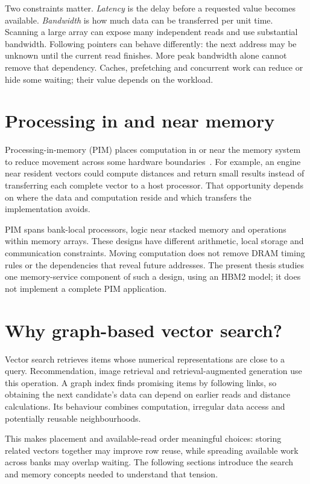 \documentclass[11pt,a4paper]{report}
\begin{document}
Two constraints matter. \emph{Latency} is the delay before a requested value becomes available. \emph{Bandwidth} is how much data can be transferred per unit time. Scanning a large array can expose many independent reads and use substantial bandwidth. Following pointers can behave differently: the next address may be unknown until the current read finishes. More peak bandwidth alone cannot remove that dependency. Caches, prefetching and concurrent work can reduce or hide some waiting; their value depends on the workload.

\section{Processing in and near memory}
Processing-in-memory (PIM) places computation in or near the memory system to reduce movement across some hardware boundaries~\cite{primer}. For example, an engine near resident vectors could compute distances and return small results instead of transferring each complete vector to a host processor. That opportunity depends on where the data and computation reside and which transfers the implementation avoids.

PIM spans bank-local processors, logic near stacked memory and operations within memory arrays. These designs have different arithmetic, local storage and communication constraints. Moving computation does not remove DRAM timing rules or the dependencies that reveal future addresses. The present thesis studies one memory-service component of such a design, using an HBM2 model; it does not implement a complete PIM application.

\section{Why graph-based vector search?}
Vector search retrieves items whose numerical representations are close to a query. Recommendation, image retrieval and retrieval-augmented generation use this operation. A graph index finds promising items by following links, so obtaining the next candidate's data can depend on earlier reads and distance calculations. Its behaviour combines computation, irregular data access and potentially reusable neighbourhoods.

This makes placement and available-read order meaningful choices: storing related vectors together may improve row reuse, while spreading available work across banks may overlap waiting. The following sections introduce the search and memory concepts needed to understand that tension.
\end{document}
